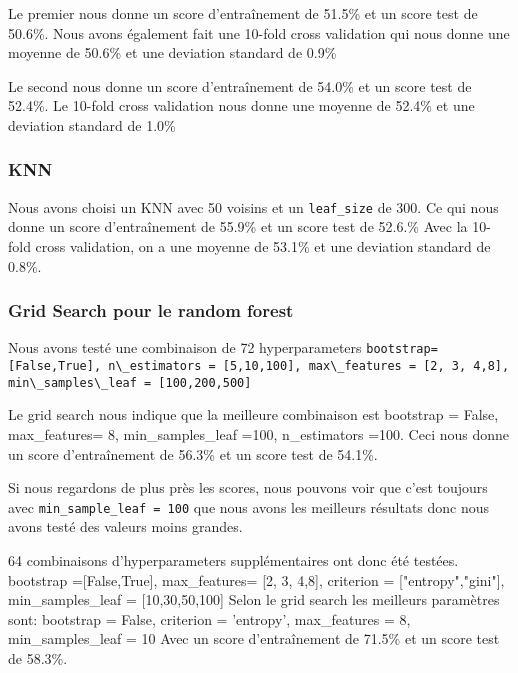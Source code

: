 Le premier nous donne un score d'entraînement de 51.5\% et un score test de 50.6\%. Nous avons également fait une 10-fold cross validation qui nous donne une moyenne de 50.6\% et une deviation standard de 0.9\%

Le second nous donne un score d'entraînement de 54.0\% et un score test de 52.4\%. Le 10-fold cross validation nous donne une moyenne de 52.4\% et une deviation standard de 1.0\%

\subsubsection{KNN}
Nous avons choisi un KNN avec 50 voisins et un \lstinline!leaf_size! de 300. Ce qui nous donne un score d'entraînement de 55.9\% et un score test de 52.6.\% Avec la 10-fold cross validation, on a une moyenne de 53.1\% et une deviation standard de 0.8\%.

\subsubsection{Grid Search pour le random forest}
Nous avons testé une combinaison de 72 hyperparameters \newline
\lstinline!bootstrap= [False,True], n\_estimators = [5,10,100], max\_features = [2, 3, 4,8], min\_samples\_leaf = [100,200,500]! \newline

Le grid search nous indique que la meilleure combinaison est bootstrap = False, max\_features= 8, min\_samples\_leaf =100, n\_estimators =100. \newline
Ceci nous donne un score d'entraînement de 56.3\% et un score test de 54.1\%.

Si nous regardons de plus près les scores, nous pouvons voir que c'est toujours avec \lstinline!min_sample_leaf = 100! que nous avons les meilleurs résultats donc nous avons testé des valeurs moins grandes.

64 combinaisons d'hyperparameters supplémentaires ont donc été testées.\newline
bootstrap =[False,True], max\_features= [2, 3, 4,8], criterion = ["entropy","gini"], min\_samples\_leaf =  [10,30,50,100] \newline
Selon le grid search les meilleurs paramètres sont: bootstrap = False, criterion = 'entropy', max\_features = 8, min\_samples\_leaf = 10 \newline
Avec un score d'entraînement de 71.5\% et un score test de 58.3\%.

